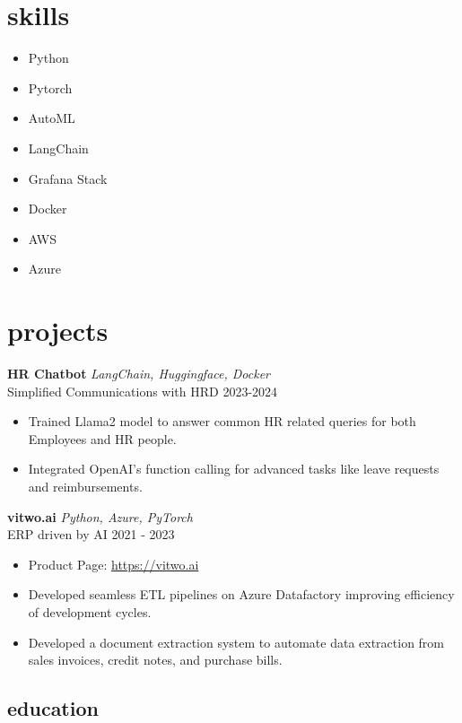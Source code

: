 \documentclass[12pt]{article}
\newcommand{\entry}[4]{{{\textbf{#1}}} \hfill #3 \\ #2 \hfill #4}
\begin{document}
\begin{paracol}{2}
\switchcolumn

\section{skills}
\begin{itemize}[itemsep=1pt,label={\faCode}]
  \item Python
  \item Pytorch
  \item AutoML
  \item LangChain
  \item Grafana Stack
  \item Docker
  \item AWS
  \item Azure
\end{itemize}


\switchcolumn

\section{projects}

\entry{HR Chatbot}{Simplified Communications with HRD}{\emph{LangChain, Huggingface, Docker}}{2023-2024}
\begin{itemize}
  \item Trained Llama2 model to answer common HR related queries for both Employees and HR people.
  \item Integrated OpenAI's function calling for advanced tasks like leave requests and reimbursements.
\end{itemize}

\entry{vitwo.ai}{ERP driven by AI}{\emph{Python, Azure, PyTorch}}{2021 - 2023}
\begin{itemize}
  \item Product Page: \href{https://vitwo.ai}{https://vitwo.ai}
  \item Developed seamless ETL pipelines on Azure Datafactory improving efficiency of development cycles.
  \item Developed a document extraction system to automate data extraction from sales invoices, credit notes, and purchase bills.
\end{itemize}



\switchcolumn
\begin{flushleft}
\section{education}


\end{flushleft}
\end{paracol}
\end{document}
